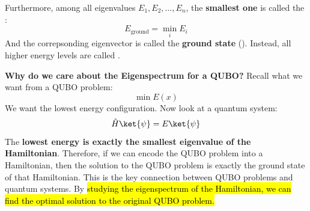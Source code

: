 \highspace
Furthermore, among all eigenvalues $E_1, E_2, \ldots, E_n$, the \textbf{smallest one} is called the :
\begin{equation}\label{eq:ground-state-energy}
    E_{\text{ground}} = \min_{i} E_i
\end{equation}
And the correpsonding eigenvector is called the \textbf{ground state} (). Instead, all higher energy levels are called .

\highspace
\textcolor{Green3}{ \textbf{Why do we care about the Eigenspectrum for a QUBO?}} Recall what we want from a QUBO problem:
\begin{equation*}
    \min E(x)
\end{equation*}
We want the lowest energy configuration. Now look at a quantum system:
\begin{equation*}
    \hat{H} \ket{\psi} = E \ket{\psi}
\end{equation*}
The \textbf{lowest energy is exactly the smallest eigenvalue of the Hamiltonian}. Therefore, if we can encode the QUBO problem into a Hamiltonian, then the solution to the QUBO problem is exactly the ground state of that Hamiltonian. This is the key connection between QUBO problems and quantum systems. By \hl{studying the eigenspectrum of the Hamiltonian, we can find the optimal solution to the original QUBO problem.}